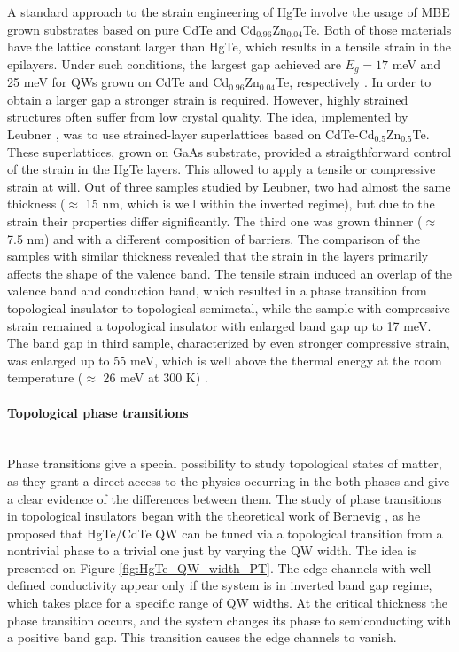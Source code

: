 \documentclass[titlepage,a4paper]{book}
\newcommand{\wciecie}{\quad\phantom{v}}
\newcommand{\myparagraph}[1]{\paragraph{#1}\mbox{}\\}
\begin{document}
A standard approach to the strain engineering of HgTe involve the usage of MBE grown substrates based on pure CdTe and Cd$_{0.96}$Zn$_{0.04}$Te. Both of those materials have the lattice constant larger than HgTe, which results in a tensile strain in the epilayers. Under such conditions, the largest gap achieved are $E_g = 17$ meV and 25 meV for QWs grown on CdTe and Cd$_{0.96}$Zn$_{0.04}$Te, respectively \cite{Pfeuffer_State}. In order to obtain a larger gap a stronger strain is required. However, highly strained structures often suffer from low crystal quality. The idea, implemented by Leubner \cite{Leubner_State}, was to use strained-layer superlattices based on CdTe-Cd$_{0.5}$Zn$_{0.5}$Te. These superlattices, grown on GaAs substrate, provided a straigthforward control of the strain in the HgTe layers. This allowed to apply a tensile or compressive strain at will. Out of three samples studied by Leubner, two had almost the same thickness ($\approx$ 15 nm, which is well within the inverted regime), but due to the strain their properties differ significantly. The third one was grown thinner ($\approx$ 7.5 nm) and with a different composition of barriers. The comparison of the samples with similar thickness revealed that the strain in the layers primarily affects the shape of the valence band. The tensile strain induced an overlap of the valence band and conduction band, which resulted in a phase transition from topological insulator to topological semimetal, while the sample with compressive strain remained a topological insulator with enlarged band gap up to 17 meV. The band gap in third sample, characterized by even stronger compressive strain, was enlarged up to 55 meV, which is well above the thermal energy at the room temperature ($\approx$ 26 meV at 300 K) \cite{Leubner_State}. 

\myparagraph{Topological phase transitions}
\wciecie
Phase transitions give a special possibility to study topological states of matter, as they grant a direct access to the physics occurring in the both phases and give a clear evidence of the differences between them. The study of phase transitions in topological insulators began with the theoretical work of Bernevig \cite{Bernevig_Topology2}, as he proposed that HgTe/CdTe QW can be tuned via a topological transition from a nontrivial phase to a trivial one just by varying the QW width. The idea is presented on Figure \ref{fig:HgTe_QW_width_PT}. The edge channels with well defined conductivity appear only if the system is in inverted band gap regime, which takes place for a specific range of QW widths. At the critical thickness the phase transition occurs, and the system changes its phase to semiconducting with a positive band gap. This transition causes the edge channels to vanish.
\end{document}
